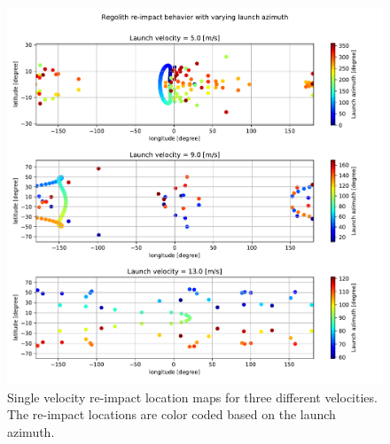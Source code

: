 \begin{figure}[htb]
\centering
\captionsetup{justification=centering}
\includegraphics[width=\textwidth, height=0.6\textheight, keepaspectratio=true]{Images/longest_edge_no_perturbations/re-impact_behavior_with_azimuth.pdf}
\caption{Single velocity re-impact location maps for three different velocities. The re-impact locations are color coded based on the launch azimuth.}
\label{fig:crashmap_launchAzimuth_noSP}
\end{figure}
\FloatBarrier
